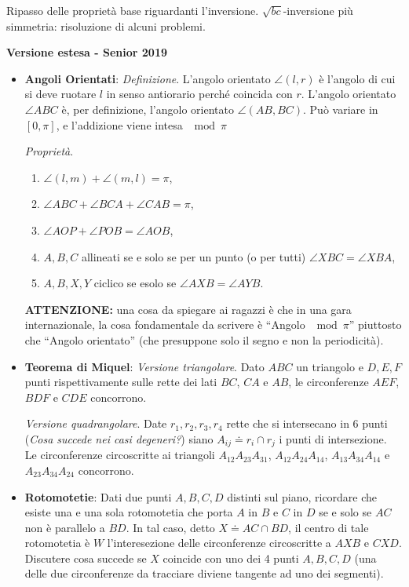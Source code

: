 Ripasso delle proprietà base riguardanti l'inversione. $\sqrt{bc}$-inversione più simmetria: risoluzione di alcuni problemi.

\vspace{0.3cm}
\large{\textbf{Versione estesa - Senior 2019}}\normalsize

\vspace{0.3cm}

\begin{itemize}
	\item \textbf{Angoli Orientati}:
	\emph{Definizione}. L'angolo orientato $\angle(l,r)$ è l'angolo di cui si deve ruotare $l$ in senso antiorario perché coincida con $r$. L'angolo orientato $\angle ABC$ è, per definizione, l'angolo orientato $\angle(AB,BC)$. Può variare in $[0,\pi]$, e l'addizione viene intesa $\mod \pi$
	
	\emph{Proprietà}. 
	\begin{enumerate}
		\item $\angle(l,m)+\angle(m,l)=\pi$,
		\item $\angle ABC+\angle BCA+\angle CAB=\pi$,
		\item $\angle AOP + \angle POB=\angle AOB$,
		\item $A,B,C$ allineati se e solo se per un punto (o per tutti) $\angle XBC=\angle XBA$,
		\item $A,B,X,Y$ ciclico se esolo se $\angle AXB=\angle AYB$. 
	\end{enumerate}
	
	\textbf{ATTENZIONE:} una cosa da spiegare ai ragazzi è che in una gara internazionale, la cosa fondamentale da scrivere è ``Angolo $\mod \pi$'' piuttosto che ``Angolo orientato'' (che presuppone solo il segno e non la periodicità).

	\item \textbf{Teorema di Miquel}:
	\emph{Versione triangolare}. Dato $ABC$ un triangolo e $D,E,F$ punti rispettivamente sulle rette dei lati $BC$, $CA$ e $AB$, le circonferenze $AEF$, $BDF$ e $CDE$ concorrono. 
	
	\emph{Versione quadrangolare}. Date $r_1,r_2,r_3,r_4$ rette che si intersecano in 6 punti (\emph{Cosa succede nei casi degeneri?}) siano $A_{ij}\doteq r_i\cap r_j$ i punti di intersezione. Le circonferenze circoscritte ai triangoli $A_{12}A_{23}A_{31}$, $A_{12}A_{24}A_{14}$, $A_{13}A_{34}A_{14}$ e $A_{23}A_{34}A_{24}$ concorrono.

\item \textbf{Rotomotetie}: Dati due punti $A,B,C,D$ distinti sul piano, ricordare che esiste una e una sola rotomotetia che porta $A$ in $B$ e $C$ in $D$ se e solo se $AC$ non è parallelo a $BD$. In tal caso, detto $X\doteq AC\cap BD$, il centro di tale rotomotetia è $W$ l'interesezione delle circonferenze circoscritte a $AXB$ e $CXD$. Discutere cosa succede se $X$ coincide con uno dei 4 punti $A,B,C,D$ (una delle due circonferenze da tracciare diviene tangente ad uno dei segmenti).


\end{itemize}

